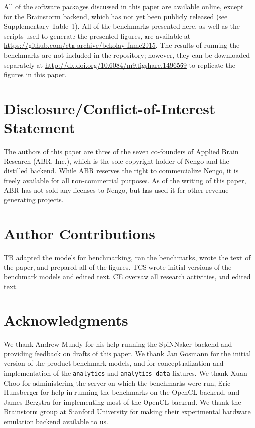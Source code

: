 \documentclass{frontiersSCNS}
\begin{document}
All of the software packages discussed in this paper
are available online,
except for the Brainstorm backend,
which has not yet been publicly released
(see Supplementary Table~1).
All of the benchmarks presented here,
as well as the scripts used to generate
the presented figures,
are available at
\url{https://github.com/ctn-archive/bekolay-fnme2015}.
The results of running the benchmarks
are not included in the repository;
however, they can be downloaded separately at
\url{http://dx.doi.org/10.6084/m9.figshare.1496569}
to replicate the figures in this paper.

\section*{Disclosure/Conflict-of-Interest Statement}

The authors of this paper
are three of the seven co-founders
of Applied Brain Research (ABR, Inc.),
which is the sole copyright holder
of Nengo and the distilled backend.
While ABR reserves the right
to commercialize Nengo,
it is freely available
for all non-commercial purposes.
As of the writing of this paper,
ABR has not sold any licenses to Nengo,
but has used it
for other revenue-generating projects.

\section*{Author Contributions}

TB adapted the models for benchmarking,
ran the benchmarks,
wrote the text of the paper,
and prepared all of the figures.
TCS wrote initial versions of the benchmark models
and edited text.
CE oversaw all research activities,
and edited text.

\section*{Acknowledgments}

We thank Andrew Mundy for his help
running the SpiNNaker backend
and providing feedback on drafts of this paper.
We thank Jan Gosmann for the initial version
of the product benchmark models,
and for conceptualization and implementation
of the \texttt{analytics} and \texttt{analytics\_data}
fixtures.
We thank Xuan Choo for administering
the server on which the benchmarks were run,
Eric Hunsberger for help in running
the benchmarks on the OpenCL backend,
and James Bergstra for
implementing most of the OpenCL backend.
We thank the Brainstorm group
at Stanford University for making
their experimental hardware emulation backend
available to us.
\end{document}
